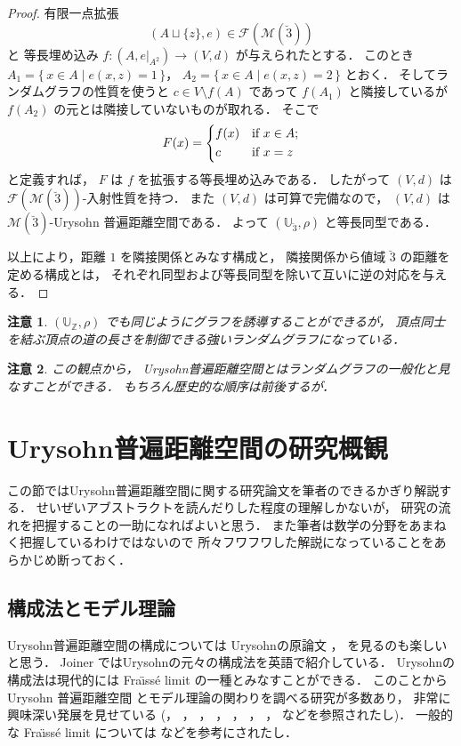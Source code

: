 \documentclass[leqno, 12pt]{jsarticle}
\newtheorem*{rmk}{注意}
\newcommand{\zz}{\mathbb{Z}}
\newcommand{\Met}[1]{\mathscr{M}(#1)}
\newcommand{\FinitePart}[1]{\mathscr{F}(#1)}
\newcommand{\FinMet}[1]{\FinitePart{\Met{#1}}}
\newcommand{\Ury}{\mathbb{U}}
\newcommand{\UryOf}[1]{\Ury_{#1}}
\newcommand{\restr}[2]{#1|_{#2}}
\newcommand{\InitSeg}[1]{\breve{#1}}
\begin{document}
\begin{proof}
有限一点拡張
\[
(A\sqcup\{z\}, e)\in\FinMet{\InitSeg{3}}
\]
と
等長埋め込み
$f\colon  (A, \restr{e}{A^2})\to (V, d)$
が与えられたとする．
このとき
$A_{1}=\{\, x\in A\mid e(x, z)=1\, \}$，
$A_{2}=\{\, x\in A\mid e(x, z)=2\, \}$
とおく．
そしてランダムグラフの性質を使うと
$c\in V\setminus f(A)$
であって
$f(A_{1})$
と隣接しているが
$f(A_{2})$
の元とは隣接していないものが取れる．
そこで
\[
F(x)=
\begin{dcases}
f(x) & \text{if $x\in A$};\\
c & \text{if $x=z$}
\end{dcases}
\]
と定義すれば，
$F$
は
$f$
を拡張する等長埋め込みである．
したがって
$(V, d)$
は
$\FinMet{\InitSeg{3}}$-入射性質を持つ．
また
$(V,d)$
は可算で完備なので，
$(V, d)$
は
$\Met{\InitSeg{3}}$-Urysohn
普遍距離空間である．
よって
$(\UryOf{\InitSeg{3}}, \rho)$
と等長同型である．




以上により，距離
$1$
を隣接関係とみなす構成と，
隣接関係から値域
$\InitSeg{3}$
の距離を定める構成とは，
それぞれ同型および等長同型を除いて互いに逆の対応を与える．
\end{proof}

\begin{rmk}\label{rmk:random-graph:integer-urysohn}
$(\UryOf{\zz}, \rho)$
でも同じようにグラフを誘導することができるが，
頂点同士を結ぶ頂点の道の長さを制御できる強いランダムグラフになっている．
\end{rmk}

\begin{rmk}\label{rmk:random-graph:urysohn-generalization}
この観点から，%
Urysohn普遍距離空間とはランダムグラフの一般化と見なすことができる．%
もちろん歴史的な順序は前後するが．
\end{rmk}



\newpage
\section{Urysohn普遍距離空間の研究概観}\label{sec:shoukai}

この節ではUrysohn普遍距離空間に関する研究論文を筆者のできるかぎり解説する．
せいぜいアブストラクトを読んだりした程度の理解しかないが，
研究の流れを把握することの一助になればよいと思う．
また筆者は数学の分野をあまねく把握しているわけではないので
所々フワフワした解説になっていることをあらかじめ断っておく．
\subsection{構成法とモデル理論}\label{subsec:research:constructions}
Urysohn普遍距離空間の構成については
Urysohnの原論文
\cite{Ury1}，
\cite{Ury2}
を見るのも楽しいと思う．
Joiner
\cite{J}
ではUrysohnの元々の構成法を英語で紹介している．
Urysohnの構成法は現代的には
Fra\"{\i}ss\'{e} limit
の一種とみなすことができる．
このことから
Urysohn
普遍距離空間
とモデル理論の関わりを調べる研究が多数あり，
非常に興味深い発展を見せている
(\cite{CT}，
\cite{conantthesis}，
\cite{conant}，
\cite{conant2}，
\cite{CL}，
\cite{Hub}，
\cite{KT}，
\cite{TZ}
などを参照されたし)．
一般的な
Fra\"{\i}ss\'{e} limit
については
 \cite{Hodges}
 などを参考にされたし．
\end{document}

